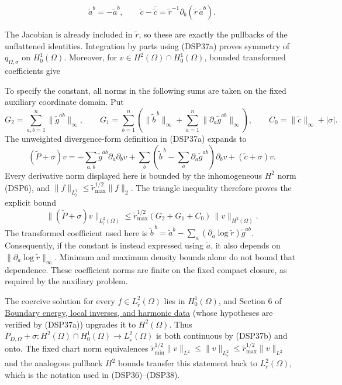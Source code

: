 \documentclass[
  11pt,
]{article}
\begin{document}
\[
 \widetilde a^b=-\overline{\widetilde a^b},\qquad
 \widetilde c-\overline{\widetilde c}
 =\widetilde r^{-1}\partial_b(\widetilde r\,\widetilde a^b).
 \tag{DSP37a}
\]

The Jacobian is already included in \(\widetilde r\), so these are
exactly the pullbacks of the unflattened identities. Integration by
parts using (DSP37a) proves symmetry of \(q_{\Omega,\sigma}\) on
\(H_0^1(\Omega)\). Moreover, for \(v\in H^2(\Omega)\cap H_0^1(\Omega)\),
bounded transformed coefficients give

To specify the constant, all norms in the following sums are taken on
the fixed auxiliary coordinate domain. Put \[
 G_2=\sum_{a,b=1}^n\|\widetilde g^{ab}\|_\infty,\qquad
 G_1=\sum_{b=1}^n\left(\|\widetilde b^{\,b}\|_\infty+
                       \sum_{a=1}^n\|\partial_a\widetilde g^{ab}\|_\infty\right),
 \qquad C_0=\|\widetilde c\|_\infty+|\sigma|.
\] The unweighted divergence-form definition in (DSP37a) expands to \[
 (\widetilde P+\sigma)v
 =-\sum_{a,b}\widetilde g^{ab}\partial_a\partial_bv
 +\sum_b\left(\widetilde b^{\,b}-\sum_a\partial_a\widetilde g^{ab}\right)
                   \partial_bv+(\widetilde c+\sigma)v.
\] Every derivative norm displayed here is bounded by the inhomogeneous
\(H^2\) norm (DSP6), and
\(\|f\|_{L^2_{\widetilde r}}\leq\widetilde r_{\max}^{1/2}\|f\|_2\). The
triangle inequality therefore proves the explicit bound \[
 \|(\widetilde P+\sigma)v\|_{L^2_{\widetilde r}(\Omega)}
 \leq \widetilde r_{\max}^{1/2}(G_2+G_1+C_0)\,
                \|v\|_{H^2(\Omega)}.
 \tag{DSP37b}
\] The transformed coefficient used here is
\(\widetilde b^{\,b}=\widetilde a^b-
 \sum_a(\partial_a\log\widetilde r)\widetilde g^{ab}\). Consequently, if
the constant is instead expressed using \(\widetilde a\), it also
depends on \(\|\partial_a\log\widetilde r\|_\infty\). Minimum and
maximum density bounds alone do not bound that dependence. These
coefficient norms are finite on the fixed compact closure, as required
by the auxiliary problem.

The coercive solution for every \(f\in L^2_{\widetilde r}(\Omega)\) lies
in \(H_0^1(\Omega)\), and Section 6 of
\href{second-order-boundary.pdf}{Boundary energy, local inverses, and
harmonic data} (whose hypotheses are verified by (DSP37a)) upgrades it
to \(H^2(\Omega)\). Thus
\(P_{D,\Omega}+\sigma:H^2(\Omega)\cap H_0^1(\Omega)\to
L^2_{\widetilde r}(\Omega)\) is both continuous by (DSP37b) and onto.
The fixed chart norm equivalences
\(\widetilde r_{\min}^{1/2}\|v\|_{L^2}\le
\|v\|_{L^2_{\widetilde r}}\le\widetilde r_{\max}^{1/2}\|v\|_{L^2}\) and
the analogous pullback \(H^2\) bounds transfer this statement back to
\(L^2_r(\Omega)\), which is the notation used in (DSP36)--(DSP38).
\end{document}
